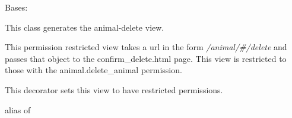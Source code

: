 \documentclass[letterpaper,10pt,english]{sphinxmanual}
\begin{document}
\begin{fulllineitems}
\label{api:mousedb.animal.views.AnimalDelete}
Bases: \href{http://docs.djangoproject.com/en/dev/ref/class-based-views/\#django.views.generic.edit.DeleteView}{}

This class generates the animal-delete view.

This permission restricted view takes a url in the form \emph{/animal/\#/delete} and passes that object to the confirm\_delete.html page.
This view is restricted to those with the animal.delete\_animal permission.


\begin{fulllineitems}
\label{api:mousedb.animal.views.AnimalDelete.dispatch}
This decorator sets this view to have restricted permissions.

\end{fulllineitems}



\begin{fulllineitems}
\label{api:mousedb.animal.views.AnimalDelete.model}
alias of 

\end{fulllineitems}


\end{fulllineitems}


\end{document}

